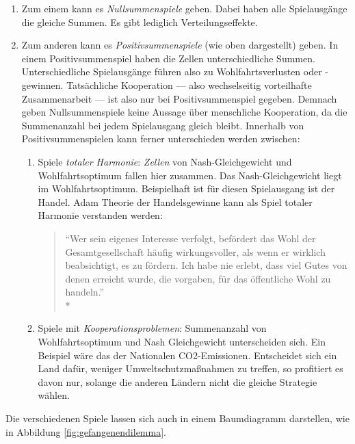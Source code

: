 \begin{enumerate}
	\item Zum einem kann es \emph{Nullsummenspiele} geben.
	Dabei haben alle Spielausgänge die gleiche Summen.
	Es gibt lediglich Verteilungseffekte.
	\item Zum anderen kann es \emph{Positivsummenspiele} (wie oben dargestellt) geben.
	In einem Positivsummenspiel haben die Zellen unterschiedliche Summen. Unterschiedliche Spielausgänge führen also zu Wohlfahrtsverlusten oder -gewinnen.
	Tatsächliche Kooperation --- also wechselseitig vorteilhafte Zusammenarbeit --- ist also nur bei Positivsummenspiel gegeben.
	Demnach geben Nullsummenspiele keine Aussage über menschliche Kooperation, da die Summenanzahl bei jedem Spielausgang gleich bleibt.
	Innerhalb von Positivsummenspielen kann ferner unterschieden werden zwischen:
	\begin{enumerate}
		\item Spiele \emph{totaler Harmonie}: \emph{Zellen} von Nash-Gleichgewicht und Wohlfahrtsoptimum fallen hier zusammen.
		Das Nash-Gleichgewicht liegt im Wohlfahrtsoptimum.
		Beispielhaft ist für diesen Spielausgang ist der Handel.
		Adam \textcite{Smith-1776-lq} Theorie der Handelsgewinne kann als Spiel totaler Harmonie verstanden werden:
		\begin{quote}
			``Wer sein eigenes Interesse verfolgt, befördert das Wohl der Gesamtgesellschaft häufig wirkungsvoller, als wenn er wirklich beabsichtigt, es zu fördern.
			Ich habe nie erlebt, dass viel Gutes von denen erreicht wurde, die vorgaben, für das öffentliche Wohl zu handeln.''\\*
			\textcite{Smith-1776-lq}
		\end{quote}

		\item Spiele mit \emph{Kooperationsproblemen}: Summenanzahl von Wohlfahrtsoptimum und Nash Gleichgewicht unterscheiden sich.
		Ein Beispiel wäre das der Nationalen CO2-Emissionen.
		Entscheidet sich ein Land dafür, weniger Umweltschutzmaßnahmen zu treffen, so profitiert es davon nur, solange die anderen Ländern nicht die gleiche Strategie wählen.
	\end{enumerate}
\end{enumerate}

Die verschiedenen Spiele lassen sich auch in einem Baumdiagramm darstellen, wie in Abbildung \ref{fig:gefangenendilemma}.

